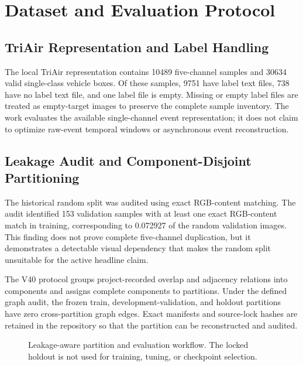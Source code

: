 \section{Dataset and Evaluation Protocol}

\subsection{TriAir Representation and Label Handling}

The local TriAir representation contains 10489 five-channel samples and 30634 valid single-class vehicle boxes. Of these samples, 9751 have label text files, 738 have no label text file, and one label file is empty. Missing or empty label files are treated as empty-target images to preserve the complete sample inventory. The work evaluates the available single-channel event representation; it does not claim to optimize raw-event temporal windows or asynchronous event reconstruction.

\subsection{Leakage Audit and Component-Disjoint Partitioning}

The historical random split was audited using exact RGB-content matching. The audit identified 153 validation samples with at least one exact RGB-content match in training, corresponding to 0.072927 of the random validation images. This finding does not prove complete five-channel duplication, but it demonstrates a detectable visual dependency that makes the random split unsuitable for the active headline claim.

The V40 protocol groups project-recorded overlap and adjacency relations into components and assigns complete components to partitions. Under the defined graph audit, the frozen train, development-validation, and holdout partitions have zero cross-partition graph edges. Exact manifests and source-lock hashes are retained in the repository so that the partition can be reconstructed and audited.

\begin{figure}[t]
\centering
{}
\caption{Leakage-aware partition and evaluation workflow. The locked holdout is not used for training, tuning, or checkpoint selection.}
\label{fig:fig-2-component-disjoint-split-audit-workflow}
\end{figure}

